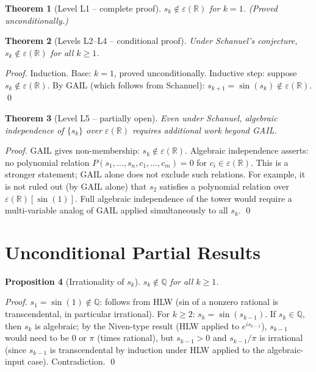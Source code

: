 \documentclass[11pt]{article}
\newtheorem{theorem}{Theorem}
\newtheorem{proposition}[theorem]{Proposition}
\begin{document}
\begin{theorem}[Level L1 -- complete proof]
$s_k \notin \varepsilon(\mathbb{R})$ for $k = 1$. \textit{(Proved unconditionally.)}
\end{theorem}

\begin{theorem}[Levels L2--L4 -- conditional proof]
Under Schanuel's conjecture, $s_k \notin \varepsilon(\mathbb{R})$ for all $k \geq 1$.
\end{theorem}

\begin{proof}
Induction. Base: $k=1$, proved unconditionally. Inductive step: suppose $s_k \notin \varepsilon(\mathbb{R})$.
By GAIL (which follows from Schanuel): $s_{k+1} = \sin(s_k) \notin \varepsilon(\mathbb{R})$. \qed
\end{proof}

\begin{theorem}[Level L5 -- partially open]
Even under Schanuel, algebraic independence of $\{s_k\}$ over $\varepsilon(\mathbb{R})$
requires additional work beyond GAIL.
\end{theorem}

\begin{proof}
GAIL gives non-membership: $s_k \notin \varepsilon(\mathbb{R})$.
Algebraic independence asserts: no polynomial relation $P(s_1, \ldots, s_n, c_1, \ldots, c_m) = 0$
for $c_i \in \varepsilon(\mathbb{R})$.
This is a stronger statement; GAIL alone does not exclude such relations.
For example, it is not ruled out (by GAIL alone) that $s_2$ satisfies a polynomial
relation over $\varepsilon(\mathbb{R})[\sin(1)]$.
Full algebraic independence of the tower would require a multi-variable
analog of GAIL applied simultaneously to all $s_k$. \qed
\end{proof}

\section{Unconditional Partial Results}

\begin{proposition}[Irrationality of $s_k$]
$s_k \notin \mathbb{Q}$ for all $k \geq 1$.
\end{proposition}

\begin{proof}
$s_1 = \sin(1) \notin \mathbb{Q}$: follows from HLW (sin of a nonzero rational is
transcendental, in particular irrational). For $k \geq 2$: $s_k = \sin(s_{k-1})$.
If $s_k \in \mathbb{Q}$, then $s_k$ is algebraic; by the Niven-type result (HLW applied to $e^{is_{k-1}}$),
$s_{k-1}$ would need to be 0 or $\pi$ (times rational), but $s_{k-1} > 0$ and
$s_{k-1}/\pi$ is irrational (since $s_{k-1}$ is transcendental by induction under HLW
applied to the algebraic-input case). Contradiction. \qed
\end{proof}
\end{document}

